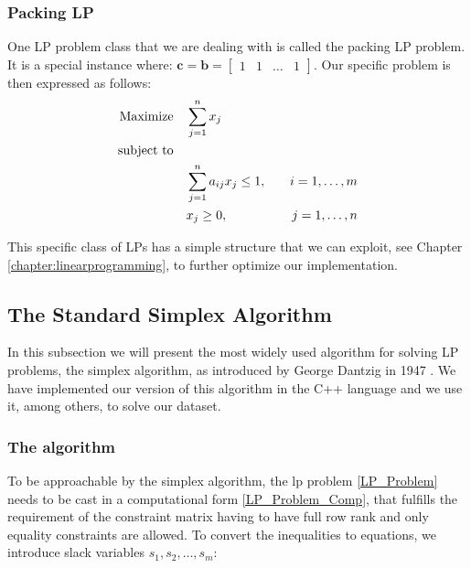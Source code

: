 \subsubsection{Packing LP}
One LP problem class that we are dealing with is called the packing LP problem. It is a special instance where:
\( \mathbf{c}  = \mathbf{b} =  \begin{bmatrix}
    1 & 1 & \dots & 1
\end{bmatrix} \).
Our specific problem is then expressed as follows:
\begin{align}
    \text{Maximize} \quad   & \sum_{j=1}^{n} x_j \notag                                                     \\
    \text{subject to} \quad & \notag                                                                        \\
                            & \sum_{j=1}^{n} a_{ij} x_j \leq 1, \quad & i = 1, \ldots, m \notag             \\
                            & x_j \geq 0, \quad                       & j = 1, \ldots, n \label{PLP_Problem}
\end{align}

This specific class of LPs has a simple structure that we can exploit, see
Chapter \ref*{chapter:linearprogramming},
to further optimize our implementation.

\subsection{The Standard Simplex Algorithm}
In this subsection we will present the most widely used algorithm for solving
LP problems, the simplex algorithm, as introduced by George Dantzig in 1947 
\parencite{dantzig1990origins}. We have implemented our version  of this algorithm 
in the C++ language and we use it, among others, to solve our dataset.
\subsubsection{The algorithm}

To be approachable by the simplex algorithm, the \gls{lp} problem
 \ref{LP_Problem} needs to be cast in a
computational form \ref{LP_Problem_Comp}, that fulfills the requirement of the constraint matrix having to have
full row rank and only equality  constraints are allowed.
To convert the inequalities to equations, we introduce slack variables \(s_1, s_2, \dots, s_m\):

